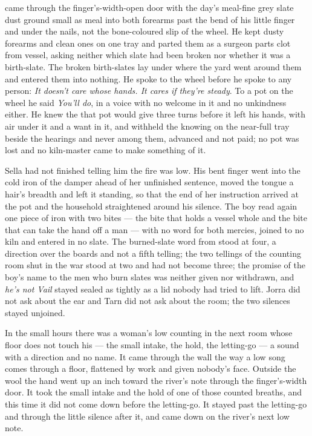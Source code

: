  came through the finger's-width-open door with the day's meal-fine grey slate dust ground small as meal into both forearms past the bend of his little finger and under the nails, not the bone-coloured slip of the wheel. He kept dusty forearms and clean ones on one tray and parted them as a surgeon parts clot from vessel, asking neither which slate had been broken nor whether it was a birth-slate. The broken birth-slates lay under  where the yard went around them and entered them into nothing. He spoke to the wheel before he spoke to any person: \emph{It doesn't care whose hands. It cares if they're steady}. To a pot on the wheel he said \emph{You'll do}, in a voice with no welcome in it and no unkindness either. He knew the  that pot would give three turns before it left his hands, with air under it and a want in it, and withheld the knowing on the near-full tray beside the hearings and never among them, advanced and not paid; no pot was lost and no kiln-master came to make something of it.

Sella had not finished telling him the fire was low. His bent finger went into the cold iron of the damper ahead of her unfinished sentence, moved the tongue a hair's breadth and left it standing, so that the end of her instruction arrived at the pot and the household straightened around his silence. The boy read again one piece of iron with two bites --- the bite that holds a vessel whole and the bite that can take the hand off a man --- with no  word for both mercies, joined to no kiln and entered in no slate. The burned-slate word from  stood at four, a direction over the boards and not a fifth telling; the two tellings of the counting room shut in the war stood at two and had not become three; the promise of the boy's name to the men who burn slates was neither given nor withdrawn, and \emph{he's not Vail} stayed sealed as tightly as a lid nobody had tried to lift. Jorra did not ask about the ear and Tarn did not ask about the room; the two silences stayed unjoined.

\scenebreak

In the small hours there was a woman's low counting in the next room whose floor does not touch his --- the small intake, the hold, the letting-go --- a sound with a direction and no name. It came through the wall the way a low song comes through a floor, flattened by work and given nobody's face. Outside the wool the hand went up an inch toward the river's note through the finger's-width door. It took the small intake and the hold of one of those counted breaths, and this time it did not come down before the letting-go. It stayed past the letting-go and through the little silence after it, and came down on the river's next low note.

